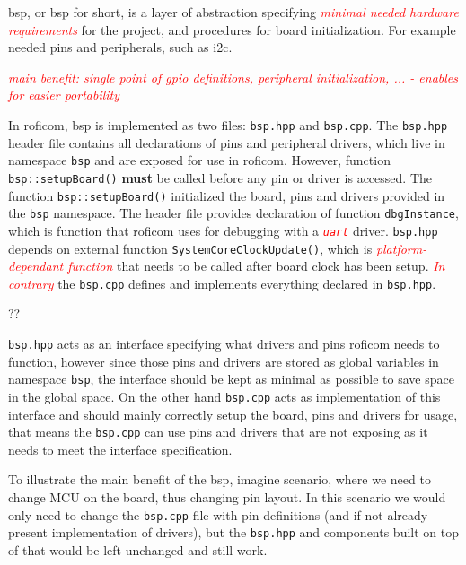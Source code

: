 \documentclass[
  digital,     %
  oneside,     %
  nosansbold,  %
  nocolorbold, %
  lof,         %
  lot,         %
]{fithesis4}
\newcommand{\TODO}[1]{\textcolor{red}{\textit{#1}}}
\begin{document}
\acrlong{bsp}, or \acrshort{bsp} for short, is a layer of abstraction specifying  \TODO{minimal needed hardware requirements} for the project, and procedures for board initialization. For example needed pins and peripherals, such as \acrshort{i2c}. 

\TODO{main benefit: single point of gpio definitions, peripheral initialization, ... - enables for easier portability}

In \acrshort{roficom}, \acrshort{bsp} is implemented as two files: \verb|bsp.hpp| and \verb|bsp.cpp|. The \verb|bsp.hpp| header file contains all declarations of pins and peripheral drivers, which live in namespace \lstinline{bsp} and are exposed for use in \acrshort{roficom}. However, function \lstinline{bsp::setupBoard()} \textbf{must} be called before any pin or driver is accessed. The function \lstinline{bsp::setupBoard()} initialized the board, pins and drivers provided in the \lstinline{bsp} namespace. The header file provides declaration of function \lstinline{dbgInstance}, which is function that \acrshort{roficom} uses for debugging with a \TODO{ \texttt{uart} } driver. \verb|bsp.hpp| depends on external function \lstinline{SystemCoreClockUpdate()}, which is \TODO{platform-dependant function} that needs to be called after board clock has been setup. \TODO{In contrary} the \verb|bsp.cpp| defines and implements everything declared in \verb|bsp.hpp|. 

??

\verb|bsp.hpp| acts as an interface specifying what drivers and pins \acrshort{roficom} needs to function, however since those pins and drivers are stored as global variables in namespace \lstinline{bsp}, the interface should be kept as minimal as possible to save space in the global space. On the other hand \verb|bsp.cpp| acts as implementation of this interface and should mainly correctly setup the board, pins and drivers for usage, that means the \verb|bsp.cpp| can use pins and drivers that are not exposing as it needs to meet the interface specification.

To illustrate the main benefit of the \acrshort{bsp}, imagine scenario, where we need to change MCU on the board, thus changing pin layout. In this scenario we would only need to change the \verb|bsp.cpp| file with pin definitions (and if not already present implementation of drivers), but the \verb|bsp.hpp| and components built on top of that would be left unchanged and still work.
\end{document}
